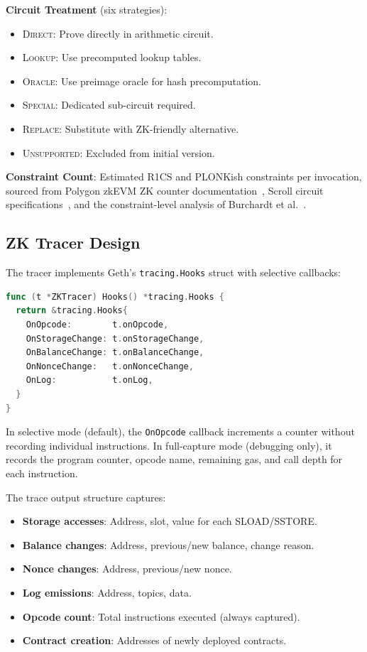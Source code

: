 \textbf{Circuit Treatment} (six strategies):
\begin{itemize}
  \item \textsc{Direct}: Prove directly in arithmetic circuit.
  \item \textsc{Lookup}: Use precomputed lookup tables.
  \item \textsc{Oracle}: Use preimage oracle for hash precomputation.
  \item \textsc{Special}: Dedicated sub-circuit required.
  \item \textsc{Replace}: Substitute with ZK-friendly alternative.
  \item \textsc{Unsupported}: Excluded from initial version.
\end{itemize}

\textbf{Constraint Count}: Estimated R1CS and PLONKish constraints per
invocation, sourced from Polygon zkEVM ZK counter
documentation~\cite{polygon2024zkcounters}, Scroll circuit
specifications~\cite{scroll2024whitepaper}, and the constraint-level
analysis of Burchardt et al.~\cite{burchardt2025constraint}.

\subsection{ZK Tracer Design}

The tracer implements Geth's \texttt{tracing.Hooks} struct with selective
callbacks:

\begin{lstlisting}[language=Go,caption={ZK Tracer hook registration}]
func (t *ZKTracer) Hooks() *tracing.Hooks {
  return &tracing.Hooks{
    OnOpcode:        t.onOpcode,
    OnStorageChange: t.onStorageChange,
    OnBalanceChange: t.onBalanceChange,
    OnNonceChange:   t.onNonceChange,
    OnLog:           t.onLog,
  }
}
\end{lstlisting}

In selective mode (default), the \texttt{OnOpcode} callback increments a
counter without recording individual instructions. In full-capture mode
(debugging only), it records the program counter, opcode name, remaining
gas, and call depth for each instruction.

The trace output structure captures:
\begin{itemize}
  \item \textbf{Storage accesses}: Address, slot, value for each SLOAD/SSTORE.
  \item \textbf{Balance changes}: Address, previous/new balance, change reason.
  \item \textbf{Nonce changes}: Address, previous/new nonce.
  \item \textbf{Log emissions}: Address, topics, data.
  \item \textbf{Opcode count}: Total instructions executed (always captured).
  \item \textbf{Contract creation}: Addresses of newly deployed contracts.
\end{itemize}

